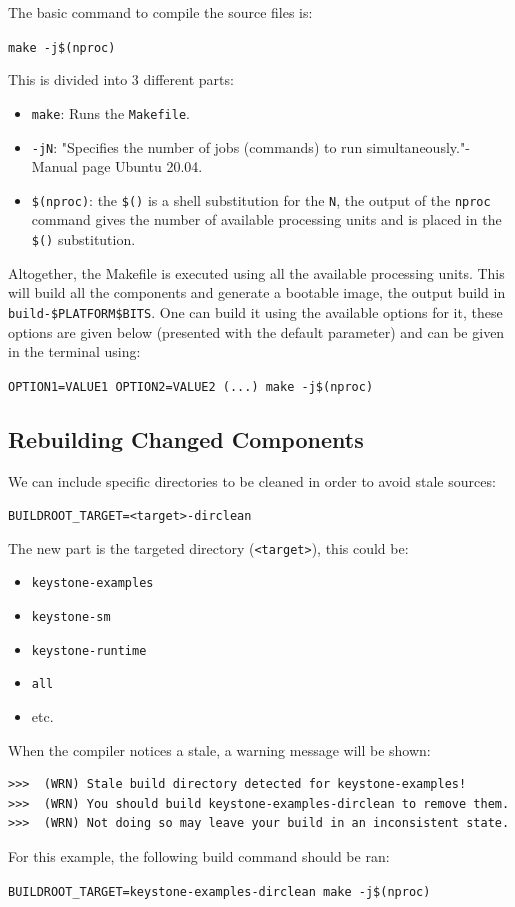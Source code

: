 \documentclass[11pt,a4paper]{report}
\begin{document}
The basic command to compile the source files is:\\
\begin{center}
\verb|make -j$(nproc)|
\end{center}
This is divided into 3 different parts:
\begin{itemize}
    \item \verb|make|: Runs the \verb|Makefile|.
    \item \verb|-jN|: "Specifies the number of jobs (commands) to run simultaneously."-Manual page Ubuntu 20.04.
    \item \verb|$(nproc)|: the \verb|$()| is a shell substitution for the \verb|N|, the output of the \verb|nproc| command gives the number of available processing units and is placed in the \verb|$()| substitution.
\end{itemize}
Altogether, the Makefile is executed using all the available processing units.
This will build all the components and generate a bootable image, the output build in \verb|build-$PLATFORM$BITS|.
One can build it using the available options for it, these options are given below (presented with the default parameter) and can be given in the terminal using: 
\begin{center}
\verb|OPTION1=VALUE1 OPTION2=VALUE2 (...) make -j$(nproc)|
\end{center}

\subsection{Rebuilding Changed Components}
We can include specific directories to be cleaned in order to avoid stale sources:
\begin{center}
\verb|BUILDROOT_TARGET=<target>-dirclean|
\end{center}
The new part is the targeted directory (\verb|<target>|),
this could be:
\begin{itemize}
    \item \verb|keystone-examples|
    \item \verb|keystone-sm|
    \item \verb|keystone-runtime|
    \item \verb|all|
    \item etc.
\end{itemize}
When the compiler notices a stale, a warning message will be shown:
\begin{verbatim}
>>>  (WRN) Stale build directory detected for keystone-examples! 
>>>  (WRN) You should build keystone-examples-dirclean to remove them. 
>>>  (WRN) Not doing so may leave your build in an inconsistent state.
\end{verbatim}
For this example, the following build command should be ran:
\begin{center}
\verb|BUILDROOT_TARGET=keystone-examples-dirclean make -j$(nproc)|
\end{center}
\end{document}
